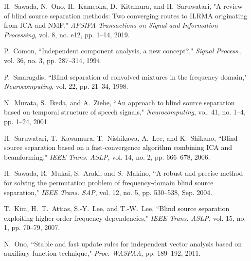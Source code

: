 \documentclass[honka]{nitkagawathesis}%
\begin{document}




\backmatter



\begin{thebibliography}{99}
  
  H.~Sawada, N.~Ono, H.~Kameoka, D.~Kitamura, and H.~Saruwatari, "A review of blind source separation methods: Two converging routes to ILRMA originating from ICA and NMF," {\em APSIPA Transactions on Signal and Information Processing}, vol. 8, no. e12, pp. 1–14, 2019.
  
  P.~Comon, ``Independent component analysis, a new concept?," {\em Signal Process.}, vol. 36, no. 3, pp. 287--314, 1994.
  
  P.~Smaragdis, ``Blind separation of convolved mixtures in the frequency domain," {\em Neurocomputing}, vol. 22, pp. 21--34, 1998.
  
  N.~Murata, S.~Ikeda, and A.~Ziehe, ``An approach to blind source separation based on temporal structure of speech signals,"  {\em Neurocomputing}, vol. 41, no. 1–4, pp. 1--24, 2001.
  
  H.~Saruwatari, T.~Kawamura, T.~Nishikawa, A.~Lee, and K.~Shikano, ``Blind source separation based on a fast-convergence algorithm combining ICA and beamforming,"  {\em IEEE Trans. ASLP}, vol. 14, no. 2, pp. 666--678, 2006.
  
  H.~Sawada, R.~Mukai, S.~Araki, and S.~Makino, ``A robust and precise method for solving the permutation problem of frequency-domain blind source separation,"  {\em IEEE Trans. SAP}, vol. 12, no. 5, pp. 530--538, Sep. 2004.
  
  T.~Kim, H.~T.~Attias, S.-Y.~Lee, and T.-W.~Lee, ``Blind source separation exploiting higher-order frequency dependencies," {\em  IEEE Trans. ASLP}, vol. 15, no. 1, pp. 70--79, 2007.
  
  N.~Ono, ``Stable and fast update rules for independent vector analysis based on auxiliary function technique," {\em  Proc. WASPAA}, pp. 189--192, 2011.
  

\end{thebibliography}
\end{document}
